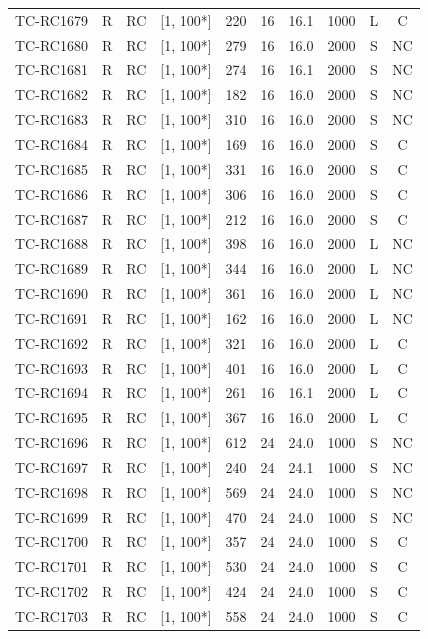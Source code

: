 \begin{longtable}{lccccccccc}
TC-RC1679 & R & RC & [1, 100*] & 220 & 16 & 16.1 & 1000 & L & C \\
TC-RC1680 & R & RC & [1, 100*] & 279 & 16 & 16.0 & 2000 & S & NC \\
TC-RC1681 & R & RC & [1, 100*] & 274 & 16 & 16.1 & 2000 & S & NC \\
TC-RC1682 & R & RC & [1, 100*] & 182 & 16 & 16.0 & 2000 & S & NC \\
TC-RC1683 & R & RC & [1, 100*] & 310 & 16 & 16.0 & 2000 & S & NC \\
TC-RC1684 & R & RC & [1, 100*] & 169 & 16 & 16.0 & 2000 & S & C \\
TC-RC1685 & R & RC & [1, 100*] & 331 & 16 & 16.0 & 2000 & S & C \\
TC-RC1686 & R & RC & [1, 100*] & 306 & 16 & 16.0 & 2000 & S & C \\
TC-RC1687 & R & RC & [1, 100*] & 212 & 16 & 16.0 & 2000 & S & C \\
TC-RC1688 & R & RC & [1, 100*] & 398 & 16 & 16.0 & 2000 & L & NC \\
TC-RC1689 & R & RC & [1, 100*] & 344 & 16 & 16.0 & 2000 & L & NC \\
TC-RC1690 & R & RC & [1, 100*] & 361 & 16 & 16.0 & 2000 & L & NC \\
TC-RC1691 & R & RC & [1, 100*] & 162 & 16 & 16.0 & 2000 & L & NC \\
TC-RC1692 & R & RC & [1, 100*] & 321 & 16 & 16.0 & 2000 & L & C \\
TC-RC1693 & R & RC & [1, 100*] & 401 & 16 & 16.0 & 2000 & L & C \\
TC-RC1694 & R & RC & [1, 100*] & 261 & 16 & 16.1 & 2000 & L & C \\
TC-RC1695 & R & RC & [1, 100*] & 367 & 16 & 16.0 & 2000 & L & C \\
TC-RC1696 & R & RC & [1, 100*] & 612 & 24 & 24.0 & 1000 & S & NC \\
TC-RC1697 & R & RC & [1, 100*] & 240 & 24 & 24.1 & 1000 & S & NC \\
TC-RC1698 & R & RC & [1, 100*] & 569 & 24 & 24.0 & 1000 & S & NC \\
TC-RC1699 & R & RC & [1, 100*] & 470 & 24 & 24.0 & 1000 & S & NC \\
TC-RC1700 & R & RC & [1, 100*] & 357 & 24 & 24.0 & 1000 & S & C \\
TC-RC1701 & R & RC & [1, 100*] & 530 & 24 & 24.0 & 1000 & S & C \\
TC-RC1702 & R & RC & [1, 100*] & 424 & 24 & 24.0 & 1000 & S & C \\
TC-RC1703 & R & RC & [1, 100*] & 558 & 24 & 24.0 & 1000 & S & C \\

\end{longtable}
